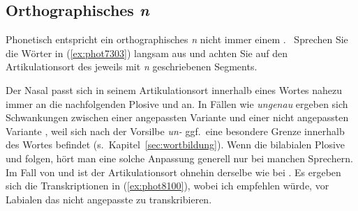 \begin{exe}
  \ex\label{ex:phot7772}
  \begin{xlist}
  \end{xlist}
\end{exe}

\subsection{Orthographisches \textit{n}}

\label{sec:orthographischesn}

Phonetisch entspricht ein orthographisches \textit{n} nicht immer einem \textipa{[n]}.
\TuBegin~Sprechen Sie die Wörter in (\ref{ex:phot7303}) langsam aus und achten Sie auf den Artikulationsort des jeweils mit \textit{n} geschriebenen Segments.

\begin{exe}
  \ex\label{ex:phot7303}
  \begin{xlist}
  \end{xlist}
\end{exe}

Der Nasal \textipa{[n]} passt sich in seinem Artikulationsort innerhalb eines Wortes nahezu immer an die nachfolgenden Plosive \textipa{[k]} und \textipa{[g]} an.
In Fällen wie \textit{ungenau} ergeben sich Schwankungen zwischen einer angepassten Variante \textipa{[PUNgen\t{aO}]} und einer nicht angepassten Variante \textipa{[PUngen\t{aO}]}, weil sich nach der Vorsilbe \textit{un-} ggf.\ eine besondere Grenze innerhalb des Wortes befindet (s.\ Kapitel~\ref{sec:wortbildung}).
Wenn die bilabialen Plosive \textipa{[p]} und \textipa{[b]} folgen, hört man eine solche Anpassung generell nur bei manchen Sprechern.
Im Fall von \textipa{[t]} und \textipa{[d]} ist der Artikulationsort ohnehin derselbe wie bei \textipa{[n]}.
Es ergeben sich die Transkriptionen in (\ref{ex:phot8100}), wobei ich empfehlen würde, vor Labialen das nicht angepasste \textipa{[n]} zu transkribieren.

